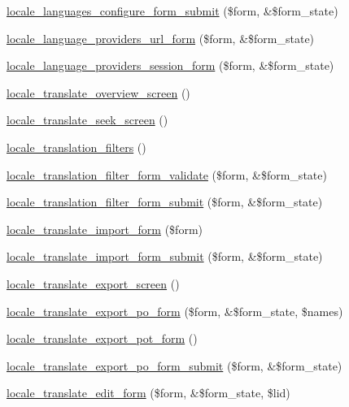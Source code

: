 \begin{DoxyCompactItemize}
\item 
\hyperlink{group__locale_gad11520d8b7d086b4b801b4a51068ed11}{locale\_\-languages\_\-configure\_\-form\_\-submit} (\$form, \&\$form\_\-state)
\item 
\hyperlink{group__locale_ga8317379be8d1288234df3c3ffb7d39ee}{locale\_\-language\_\-providers\_\-url\_\-form} (\$form, \&\$form\_\-state)
\item 
\hyperlink{group__locale_ga16437fdd6666d431070599a6243cfb11}{locale\_\-language\_\-providers\_\-session\_\-form} (\$form, \&\$form\_\-state)
\item 
\hyperlink{group__locale_gac36ea050ad5c0a75624c1a9b63c343a0}{locale\_\-translate\_\-overview\_\-screen} ()
\item 
\hyperlink{group__locale_gaa34fbb14f95e9ae562772895b284d170}{locale\_\-translate\_\-seek\_\-screen} ()
\item 
\hyperlink{group__locale_gacc11c165dc42516edefdca5eab092a28}{locale\_\-translation\_\-filters} ()
\item 
\hyperlink{group__locale_ga853ff354fb4c4c637123251916ccb4ae}{locale\_\-translation\_\-filter\_\-form\_\-validate} (\$form, \&\$form\_\-state)
\item 
\hyperlink{group__locale_gac578de2fae636045173446f2aa26bd0f}{locale\_\-translation\_\-filter\_\-form\_\-submit} (\$form, \&\$form\_\-state)
\item 
\hyperlink{group__locale_gaceb2c6612ad9bc1472e4d3c71618c9b3}{locale\_\-translate\_\-import\_\-form} (\$form)
\item 
\hyperlink{group__locale_gab96d979ef16a3468061ebb7e11e3210e}{locale\_\-translate\_\-import\_\-form\_\-submit} (\$form, \&\$form\_\-state)
\item 
\hyperlink{group__locale_gaa04044044d6c484553a41432db3924b4}{locale\_\-translate\_\-export\_\-screen} ()
\item 
\hyperlink{group__locale_ga5cac42d032877eb9c827b8ec0477a22e}{locale\_\-translate\_\-export\_\-po\_\-form} (\$form, \&\$form\_\-state, \$names)
\item 
\hyperlink{group__locale_ga670f0a541fc0b97da4bf4624c2afb434}{locale\_\-translate\_\-export\_\-pot\_\-form} ()
\item 
\hyperlink{group__locale_gaa8f71c53db9e03719bdeae8f594fb0ee}{locale\_\-translate\_\-export\_\-po\_\-form\_\-submit} (\$form, \&\$form\_\-state)
\item 
\hyperlink{group__locale_ga438cdd0b99e54bd87cd7058c6037db0e}{locale\_\-translate\_\-edit\_\-form} (\$form, \&\$form\_\-state, \$lid)
\item 

\end{DoxyCompactItemize}
